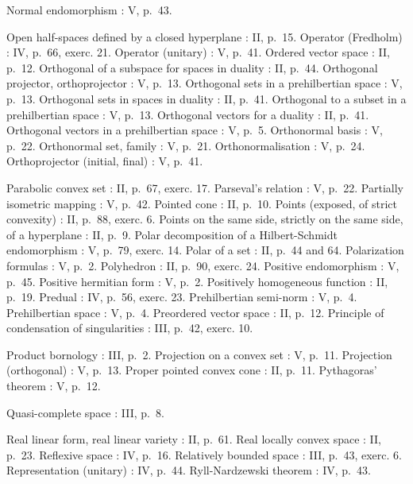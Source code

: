 Normal endomorphism : V, p.~43.

Open half-spaces defined by a closed hyperplane : II, p.~15. Operator (Fredholm) : IV, p.~66, exerc. 21. Operator (unitary) : V, p.~41. Ordered vector space : II, p.~12. Orthogonal of a subspace for spaces in duality : II, p.~44. Orthogonal projector, orthoprojector : V, p.~13. Orthogonal sets in a prehilbertian space : V, p.~13. Orthogonal sets in spaces in duality : II, p.~41. Orthogonal to a subset in a prehilbertian space : V, p.~13. Orthogonal vectors for a duality : II, p.~41. Orthogonal vectors in a prehilbertian space : V, p.~5. Orthonormal basis : V, p.~22. Orthonormal set, family : V, p.~21. Orthonormalisation : V, p.~24. Orthoprojector (initial, final) : V, p.~41.

Parabolic convex set : II, p.~67, exerc. 17. Parseval's relation : V, p.~22. Partially isometric mapping : V, p.~42. Pointed cone : II, p.~10. Points (exposed, of strict convexity) : II, p.~88, exerc. 6. Points on the same side, strictly on the same side, of a hyperplane : II, p.~9. Polar decomposition of a Hilbert-Schmidt endomorphism : V, p.~79, exerc. 14. Polar of a set : II, p.~44 and 64. Polarization formulas : V, p.~2. Polyhedron : II, p.~90, exerc. 24. Positive endomorphism : V, p.~45. Positive hermitian form : V, p.~2. Positively homogeneous function : II, p.~19. Predual : IV, p.~56, exerc. 23. Prehilbertian semi-norm : V, p.~4. Prehilbertian space : V, p.~4. Preordered vector space : II, p.~12. Principle of condensation of singularities : III, p.~42, exerc. 10.

Product bornology : III, p.~2. Projection on a convex set : V, p.~11. Projection (orthogonal) : V, p.~13. Proper pointed convex cone : II, p.~11. Pythagoras' theorem : V, p.~12.

Quasi-complete space : III, p.~8.

Real linear form, real linear variety : II, p.~61. Real locally convex space : II, p.~23. Reflexive space : IV, p.~16. Relatively bounded space : III, p.~43, exerc. 6. Representation (unitary) : IV, p.~44. Ryll-Nardzewski theorem : IV, p.~43.

